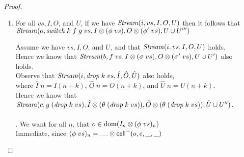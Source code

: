 \begin{proof}
\begin{enumerate}
\item For all $vs, I, O$, and $U$, if we have $\mathit{Stream}(i, vs, I, O, U)$ then it follows that $\mathit{Stream}(o, \mathit{switch}\;k\;f\;g\;vs, I \otimes (\phi\;vs), O \otimes (\phi'\;vs), U \cup U''')$
  \begin{tabbedproof}
  \oo Assume we have $vs, I, O$, and $U$, and that $\mathit{Stream}(i, vs, I, O, U)$ holds. \\
  \oo Hence we know that $\mathit{Stream}(b, f\;vs, I \otimes (\sigma\;vs), O \otimes (\sigma'\;vs), U \cup U')$ also holds. \\ 
  \oo Observe that $\mathit{Stream}(i, \mathit{drop}\;k\;vs, \hat{I}, \hat{O}, \hat{U})$ also holds, \\
  \oox   where $\hat{I}\;n = I(n+k)$, $\hat{O}\;n = O(n+k)$, and $\hat{U}\;n = U(n+k)$. \\
  \oo Hence we know that \\
  \oox $\mathit{Stream}(c, g\;(\mathit{drop}\;k\;vs), \hat{I} \otimes (\theta\;(\mathit{drop}\;k\;vs)), \hat{O} \otimes (\theta\;(\mathit{drop}\;k\;vs)), \hat{U} \cup U'')$. \\ 
  
  \\ . We want for all $n$, that $o \in \mbox{dom}({I_n \otimes (\phi\;vs)_n})$ \\
  \ooo Immediate, since $(\phi\;vs)_n = \ldots \otimes \mathsf{cell}^{-}({o}, {e}, {\_}, {\_})$ \\


\end{tabbedproof}
\end{enumerate}
\end{proof}

